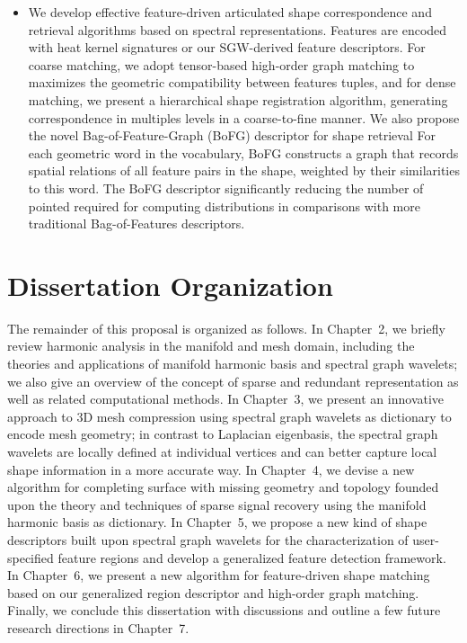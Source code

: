 \begin{itemize}
\item We develop effective feature-driven articulated shape 
correspondence and retrieval algorithms based on spectral 
representations. Features are encoded with heat kernel signatures
or our SGW-derived feature descriptors. For coarse matching, we adopt
tensor-based high-order graph matching to maximizes the 
geometric compatibility between features tuples, and for dense matching,
we present a hierarchical shape registration algorithm, generating 
correspondence in multiples levels in a coarse-to-fine manner. We also
propose the novel Bag-of-Feature-Graph (BoFG) descriptor for shape retrieval
For each geometric word in the vocabulary, BoFG constructs a graph that records
spatial relations of all feature pairs in the shape, weighted by their 
similarities to this word. The BoFG descriptor significantly reducing the number 
of pointed required for computing distributions in comparisons with more traditional 
Bag-of-Features descriptors. 

\end{itemize}

\section{Dissertation Organization}
The remainder of this proposal is organized as follows.
In Chapter~2, we briefly review harmonic analysis in the manifold and mesh
domain, including the theories and applications of manifold harmonic basis
and spectral graph wavelets; we also give an overview of the concept of
sparse and redundant representation as well as related computational methods.
In Chapter~3, we present an innovative approach to 3D mesh compression
using spectral graph wavelets as dictionary to encode mesh geometry; in
contrast to Laplacian eigenbasis, the spectral graph wavelets are locally
defined at individual vertices and can better capture local shape
information in a more accurate way.
In Chapter~4, we devise a new algorithm for completing surface with missing geometry
and topology founded upon the theory and techniques of sparse signal recovery
using the manifold harmonic basis as dictionary.
In Chapter~5, we propose a new kind of shape descriptors built upon
spectral graph wavelets for the characterization of user-specified feature regions
and develop a generalized feature detection framework.
In Chapter~6, we present a new algorithm for feature-driven shape matching based on
our generalized region descriptor and high-order graph matching.
Finally, we conclude this dissertation with discussions and outline a few future
research directions in Chapter~7.  